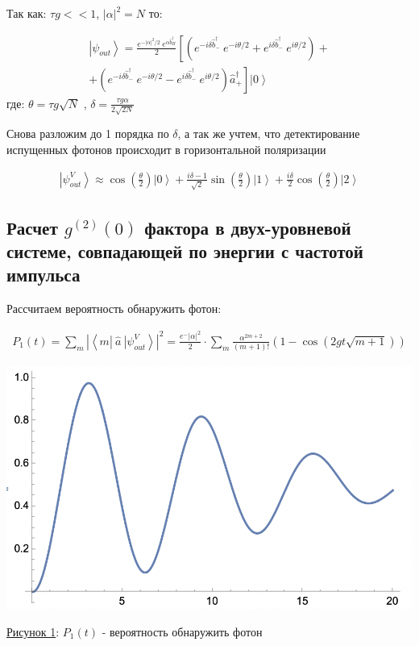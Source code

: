 \documentclass[11pt]{article}    %
\begin{document}
Так как: $\tau g << 1$, $ |\alpha|^2 = N $ то:

\begin{gather} \nonumber
    \left| \psi_{out} \right> = \frac{e^{-\left| \alpha \right|^2 / 2} \ e^{\alpha \hat{b}^{\dag}_{H}}}{2}  \left[ \left( e^{-i \delta \hat{b}^{\dag}_{-} } \ e^{-i \theta / 2} + e^{i \delta \hat{b}^{\dag}_{-} } \ e^{i \theta / 2} \right) \right. + \\
    + \left. \left( e^{-i \delta \hat{b}^{\dag}_{-} } \ e^{-i \theta / 2} - e^{i \delta \hat{b}^{\dag}_{-} } \ e^{i \theta / 2} \right) \hat{a}^{\dag}_{+} \right] \left| 0 \right>
\end{gather}
где: $\theta = \tau g \sqrt{N}$ , $\delta = \frac{\tau g \alpha}{2 \sqrt{2N}}$

Снова разложим до 1 порядка по $ \delta$, а так же учтем, что детектирование испущенных фотонов происходит в горизонтальной поляризации

\begin{gather}
    \left| \psi_{out}^V \right> \approx \cos \left( \frac{\theta }{2} \right) \left| 0 \right> + \frac{i \delta - 1}{\sqrt{2}} \sin \left( \frac{\theta}{2} \right) \left| 1 \right> + \frac{i \delta}{2} \cos \left( \frac{\theta}{2} \right) \left| 2 \right>
\end{gather}

\subsection{Расчет $g^{(2)}(0)$ фактора в двух-уровневой системе, совпадающей по энергии с частотой импульса}
Рассчитаем вероятность обнаружить фотон:

\begin{gather}
    P_1 \left( t \right) = \sum_m \left| \left< m \left| \ \hat{a} \ \right| \psi_{out}^V \right> \right|^{2} = \frac{e^-\left| \alpha \right|^2}{2} \cdot \sum_m \frac{\alpha^{2m+2}}{\left( m+1 \right)!} \left( 1 - \cos \left( 2gt \sqrt{m+1} \right) \right)
\end{gather}

\par
\begin{center}
\includegraphics[scale = 0.75]{plot1.png}
\par
    \underline{Рисунок 1}: $P_1 \left( t \right)$ - вероятность обнаружить фотон
\end{center}
\par
\end{document}
